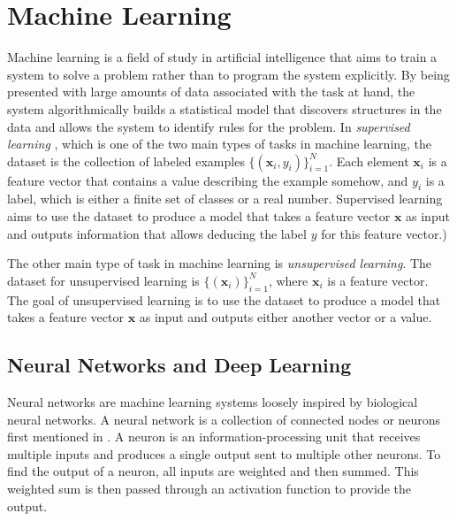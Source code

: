 \documentclass[nofilelist]{cslthse-msc}
\begin{document}
\section{Machine Learning}
Machine learning \citep{franoischollet2017learning} is a field of study in artificial intelligence that aims to train a system to solve a problem rather than to program the system explicitly. By being presented with large amounts of data associated with the task at hand, the system algorithmically builds a statistical model that discovers structures in the data and allows the system to identify rules for the problem. 
In \textit{supervised learning} \citep{100pageBurkov}, which is one of the two main types of tasks in machine learning, the dataset is the collection of labeled examples $\{(\mathbf{x}_i, y_i)\}_{i=1}^N.$ Each element $\mathbf{x}_i$ is a feature vector that contains a value describing the example somehow, and $y_i$ is a label, which is either a finite set of classes or a real number. Supervised learning aims to use the dataset to produce a model that takes a feature vector $\mathbf{x}$ as input and outputs information that allows deducing the label $y$ for this feature vector.) 

The other main type of task in machine learning is \textit{unsupervised learning}. The dataset for unsupervised learning is $\{ (\mathbf{x}_i)\}_{i=1}^N$, where $\mathbf{x}_i$ is a feature vector. The goal of unsupervised learning is to use the dataset to produce a model that takes a feature vector $\mathbf{x}$ as input and outputs either another vector or a value. 





\subsection{Neural Networks and Deep Learning}

Neural networks are machine learning systems loosely inspired by biological neural networks. A neural network is a collection of connected nodes or neurons first mentioned in \citet{mcculloch1943}. A neuron \citep{dawson1998ann} is an information-processing unit that receives multiple inputs and produces a single output sent to multiple other neurons. To find the output of a neuron, all inputs are weighted and then summed. This weighted sum is then passed through an activation function to provide the output.


\end{document}
